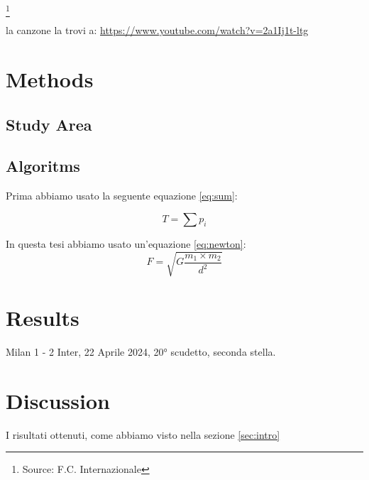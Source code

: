 \documentclass[12pt]{article}
\begin{document}
\footnote{Source: F.C. Internazionale} %

la canzone la trovi a:
\url{https://www.youtube.com/watch?v=2a1Ij1t-ltg} %

\section{Methods} %

\subsection{Study Area} %
\subsection{Algoritms}


Prima abbiamo usato la seguente equazione \ref{eq:sum}: %

\begin{equation} %
    T = \sum p_i %
\label{eq:sum} %
\end{equation} %

In questa tesi abbiamo usato un'equazione \ref{eq:newton}:
\begin{equation}
    F = \sqrt{G \frac{m_1\times m_2}{d^2}} %
\label{eq:newton}
\end{equation}

\section{Results}
Milan 1 - 2 Inter, 22 Aprile 2024, 20° scudetto, seconda stella.

\section{Discussion}
I risultati ottenuti, come abbiamo visto nella sezione \ref{sec:intro} %
\end{document}
